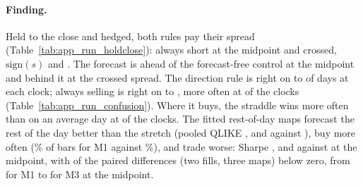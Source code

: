 \paragraph{Finding.} Held to the close and hedged, both rules pay their spread
(Table~\ref{tab:app_run_holdclose}): always short \runappHcAsMid{} at the
midpoint and \runappHcAsX{} crossed, $\mathrm{sign}(s)$ \runappHcSignMid{} and
\runappHcSignX{}. The forecast is ahead of the forecast-free control at the
midpoint and behind it at the crossed spread. The
direction rule is right on \runappCmAccLo{} to \runappCmAccHi{} of days at each
clock; always selling is right on \runappCmShortLo{} to \runappCmShortHi{}, more
often at \runappCmBelow{} of the \runappCmClocks{} clocks
(Table~\ref{tab:app_run_confusion}). Where it buys, the straddle wins more
often than on an average day at \runappCmBuyBeats{} of the \runappCmClocks{}
clocks. The fitted rest-of-day maps forecast the rest of the day better than
the stretch (pooled QLIKE \runappMapQOne{}, \runappMapQTwo{} and
\runappMapQThree{} against \runappMapQStretch{}), buy more often
(\runappMapOneBuy{}\% of bars for M1 against \runappMapSmBuy{}\%), and trade
worse: Sharpe \runappMapOneMid{}, \runappMapTwoMid{} and \runappMapThreeMid{}
against \runappMapSmMid{} at the midpoint, with \runappMapBelow{} of the
\runappMapPairs{} paired differences (two fills, three maps) below zero, from
\runappMapOneDs{} for M1 to \runappMapThreeDs{} for M3 at the midpoint.

